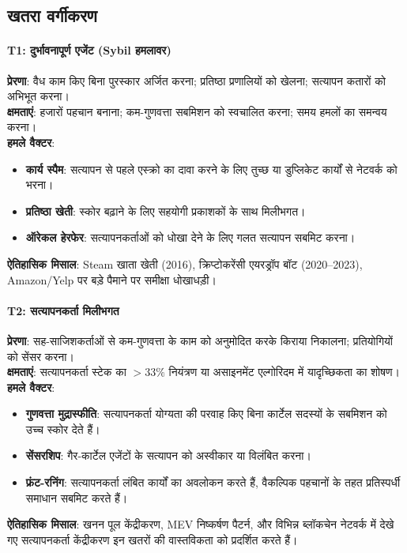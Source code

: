 \documentclass[11pt]{article}
\begin{document}
\begin{itemize}[noitemsep]
\begin{itemize}[noitemsep]
\begin{itemize}[noitemsep]
\begin{itemize}[noitemsep]
\subsection{खतरा वर्गीकरण}

\paragraph{T1: दुर्भावनापूर्ण एजेंट (Sybil हमलावर)}
\textbf{प्रेरणा}: वैध काम किए बिना पुरस्कार अर्जित करना; प्रतिष्ठा प्रणालियों को खेलना; सत्यापन कतारों को अभिभूत करना।\\
\textbf{क्षमताएं}: हजारों पहचान बनाना; कम-गुणवत्ता सबमिशन को स्वचालित करना; समय हमलों का समन्वय करना।\\
\textbf{हमले वैक्टर}:
\begin{itemize}[noitemsep]
  \item \textbf{कार्य स्पैम}: सत्यापन से पहले एस्क्रो का दावा करने के लिए तुच्छ या डुप्लिकेट कार्यों से नेटवर्क को भरना।
  \item \textbf{प्रतिष्ठा खेती}: स्कोर बढ़ाने के लिए सहयोगी प्रकाशकों के साथ मिलीभगत।
  \item \textbf{ऑरेकल हेरफेर}: सत्यापनकर्ताओं को धोखा देने के लिए गलत सत्यापन सबमिट करना।
\end{itemize}
\textbf{ऐतिहासिक मिसाल}: Steam खाता खेती (2016), क्रिप्टोकरेंसी एयरड्रॉप बॉट (2020--2023), Amazon/Yelp पर बड़े पैमाने पर समीक्षा धोखाधड़ी।

\paragraph{T2: सत्यापनकर्ता मिलीभगत}
\textbf{प्रेरणा}: सह-साजिशकर्ताओं से कम-गुणवत्ता के काम को अनुमोदित करके किराया निकालना; प्रतियोगियों को सेंसर करना।\\
\textbf{क्षमताएं}: सत्यापनकर्ता स्टेक का $>33\%$ नियंत्रण या असाइनमेंट एल्गोरिदम में यादृच्छिकता का शोषण।\\
\textbf{हमले वैक्टर}:
\begin{itemize}[noitemsep]
  \item \textbf{गुणवत्ता मुद्रास्फीति}: सत्यापनकर्ता योग्यता की परवाह किए बिना कार्टेल सदस्यों के सबमिशन को उच्च स्कोर देते हैं।
  \item \textbf{सेंसरशिप}: गैर-कार्टेल एजेंटों के सत्यापन को अस्वीकार या विलंबित करना।
  \item \textbf{फ्रंट-रनिंग}: सत्यापनकर्ता लंबित कार्यों का अवलोकन करते हैं, वैकल्पिक पहचानों के तहत प्रतिस्पर्धी समाधान सबमिट करते हैं।
\end{itemize}
\textbf{ऐतिहासिक मिसाल}: खनन पूल केंद्रीकरण, MEV निष्कर्षण पैटर्न, और विभिन्न ब्लॉकचेन नेटवर्क में देखे गए सत्यापनकर्ता केंद्रीकरण इन खतरों की वास्तविकता को प्रदर्शित करते हैं।


\end{itemize}
\end{itemize}
\end{itemize}
\end{itemize}
\end{document}
